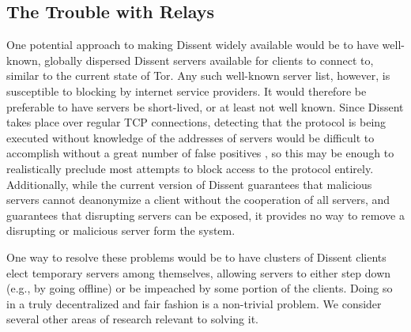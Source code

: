   \subsection{The Trouble with Relays}
  \label{Subsection:Relays}
    One potential approach to making Dissent widely available would be to have
    well-known, globally dispersed Dissent servers available for clients to
    connect to, similar to the current state of Tor. Any such well-known server
    list, however, is susceptible to blocking by internet service providers. It
    would therefore be preferable to have servers be short-lived, or at least
    not well known. Since Dissent takes place over regular TCP connections,
    detecting that the protocol is being executed without knowledge of the
    addresses of servers would be difficult to accomplish without a great number
    of false positives \cite{houmansadr_parrot_2013}, so this may be enough to
    realistically preclude most attempts to block access to the protocol
    entirely.  Additionally, while the current version of Dissent guarantees
    that malicious servers cannot deanonymize a client without the cooperation
    of all servers, and guarantees that disrupting servers can be exposed, it
    provides no way to remove a disrupting or malicious server form the system.

    One way to resolve these problems would be to have clusters of Dissent
    clients elect temporary servers among themselves, allowing servers to either
    step down (e.g., by going offline) or be impeached by some portion of the
    clients.  Doing so in a truly decentralized and fair fashion is a
    non-trivial problem.  We consider several other areas of research relevant
    to solving it.

